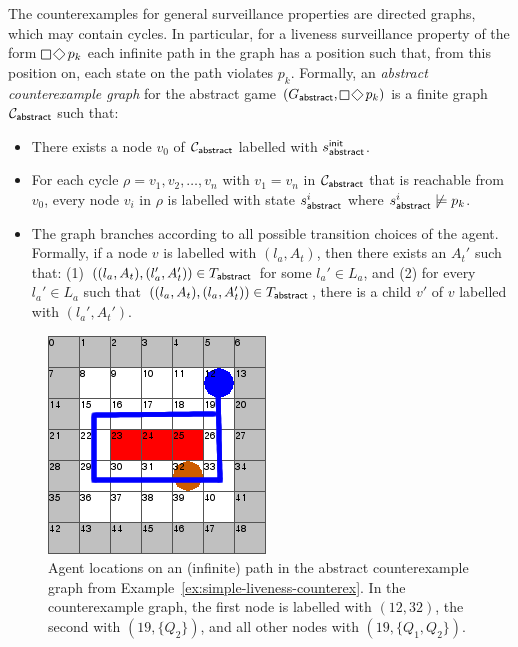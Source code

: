 The counterexamples for general surveillance properties are directed graphs, which may contain cycles. In particular, for a liveness surveillance property of the form $\LTLglobally\LTLfinally p_k$ each infinite path in the graph has a position such that, from this position on, each state on the path violates $p_k$. Formally, an \emph{abstract counterexample graph} for the abstract game $(G_\abstr,\LTLglobally\LTLfinally p_k)$ is a finite graph $\mathcal{C}_{\mathsf{abstract}}$ such that:
\begin{itemize}
\item There exists a node $v_0$ of $\mathcal{C}_{\mathsf{abstract}}$ labelled with $s^{\mathsf{init}}_{\mathsf{abstract}}$.
\item For each cycle $\rho = v_1,v_2,\ldots,v_n$ with $v_1 = v_n$ in $\mathcal{C}_{\mathsf{abstract}}$ that is reachable from $v_0$, every node $v_i$ in $\rho$ is labelled with state $s_{\mathsf{abstract}}^i$ where $s_{\mathsf{abstract}}^i \not\models p_k$.
\item The graph branches according to all possible transition choices of the agent. Formally, if a node $v$ is labelled with $(l_a,A_t)$, then there exists an $A_t'$  such that: (1) $((l_a,A_t),(l_a',A_t')) \in T_{\mathsf{abstract}}$ for some $l_a' \in L_a$, and (2) for every $l_a' \in L_a$ such that $((l_a,A_t),(l_a,A_t')) \in T_{\mathsf{abstract}}$, there is a child $v'$ of $v$ labelled with $(l_a',A_t')$.
\end{itemize}   

\begin{figure}
\begin{center}
\includegraphics[scale=.33]{figs/7x7_liveness.png}
\end{center}
\caption{Agent locations on an (infinite) path in the abstract counterexample graph from Example~\ref{ex:simple-liveness-counterex}. In the counterexample graph, the first node is labelled with $(12,32)$, the second with $(19,\{Q_2\})$, and all other nodes with $(19,\{Q_1,Q_2\})$.}
\label{fig:simple-liveness-counterex}
\end{figure}

